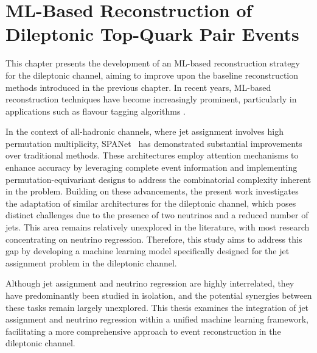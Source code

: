 \chapter{ML-Based Reconstruction of Dileptonic Top-Quark Pair Events}
\label{chap:ml-reconstruction}

This chapter presents the development of an ML-based reconstruction strategy for the dileptonic \ttbar channel, aiming to improve upon the baseline reconstruction methods introduced in the previous chapter. In recent years, ML-based reconstruction techniques have become increasingly prominent, particularly in applications such as flavour tagging algorithms \cite{flavour_tagging_review}.

In the context of all-hadronic channels, where jet assignment involves high permutation multiplicity, SPANet~\cite{spanet} has demonstrated substantial improvements over traditional methods. These architectures employ attention mechanisms to enhance accuracy by leveraging complete event information and implementing permutation-equivariant designs to address the combinatorial complexity inherent in the problem.
Building on these advancements, the present work investigates the adaptation of similar architectures for the dileptonic \ttbar channel, which poses distinct challenges due to the presence of two neutrinos and a reduced number of jets. This area remains relatively unexplored in the literature, with most research concentrating on neutrino regression. Therefore, this study aims to address this gap by developing a machine learning model specifically designed for the jet assignment problem in the dileptonic channel.

Although jet assignment and neutrino regression are highly interrelated, they have predominantly been studied in isolation, and the potential synergies between these tasks remain largely unexplored. This thesis examines the integration of jet assignment and neutrino regression within a unified machine learning framework, facilitating a more comprehensive approach to event reconstruction in the dileptonic \ttbar channel.

